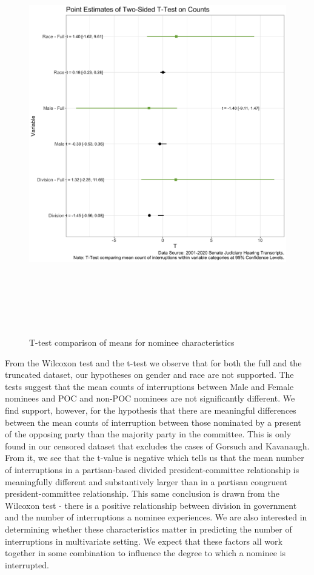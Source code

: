 \documentclass [12pt]{article}
\begin{document}
	    
	    \begin{figure}[H]
	        \centering
	        \includegraphics[height = 175mm, width = 175mm]{../tables_figures/t-test.png}
	        \caption{T-test comparison of means for nominee characteristics}
	        \label{fig:3}
	    \end{figure}

From the Wilcoxon test and the t-test we observe that for both the full and the truncated dataset, our hypotheses on gender and race are not supported. The tests suggest that the mean counts of interruptions between Male and Female nominees and POC and non-POC nominees are not significantly different. We find support, however, for the hypothesis that there are meaningful differences between the mean counts of interruption between those nominated by a present of the opposing party than the majority party in the committee. This is only found in our censored dataset that excludes the cases of Gorsuch and Kavanaugh. From it, we see that the t-value is negative which tells us that the mean number of interruptions in a partisan-based divided president-committee relationship is meaningfully different and substantively larger than in a partisan congruent president-committee relationship. This same conclusion is drawn from the Wilcoxon test - there is a positive relationship between division in government and the number of interruptions a nominee experiences. We are also interested in determining whether these characteristics matter in predicting the number of interruptions in multivariate setting. We expect that these factors all work together in some combination to influence the degree to which a nominee is interrupted. 
\end{document}
